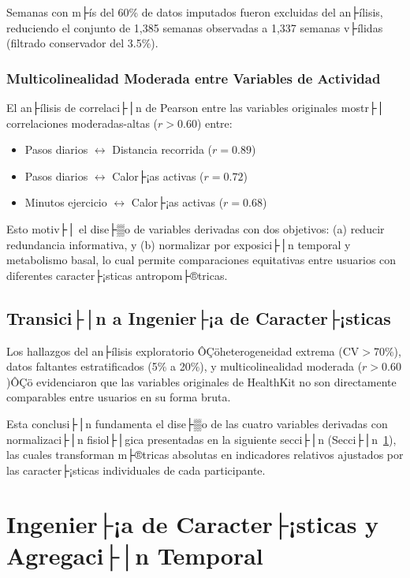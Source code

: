 Semanas con m├ís del 60\% de datos imputados fueron excluidas del an├ílisis, reduciendo el conjunto de 1,385 semanas observadas a 1,337 semanas v├ílidas (filtrado conservador del 3.5\%).

\subsubsection{Multicolinealidad Moderada entre Variables de Actividad}

El an├ílisis de correlaci├│n de Pearson entre las variables originales mostr├│ correlaciones moderadas-altas ($r>0.60$) entre:
\begin{itemize}
    \item Pasos diarios $\leftrightarrow$ Distancia recorrida ($r=0.89$)
    \item Pasos diarios $\leftrightarrow$ Calor├¡as activas ($r=0.72$)
    \item Minutos ejercicio $\leftrightarrow$ Calor├¡as activas ($r=0.68$)
\end{itemize}

Esto motiv├│ el dise├▒o de variables derivadas con dos objetivos: (a) reducir redundancia informativa, y (b) normalizar por exposici├│n temporal y metabolismo basal, lo cual permite comparaciones equitativas entre usuarios con diferentes caracter├¡sticas antropom├®tricas.

\subsection{Transici├│n a Ingenier├¡a de Caracter├¡sticas}
\label{subsec:transicion_feature_engineering}

Los hallazgos del an├ílisis exploratorio ÔÇöheterogeneidad extrema (CV$>$70\%), datos faltantes estratificados (5\% a 20\%), y multicolinealidad moderada ($r>0.60$)ÔÇö evidenciaron que las variables originales de HealthKit no son directamente comparables entre usuarios en su forma bruta.

Esta conclusi├│n fundamenta el dise├▒o de las cuatro variables derivadas con normalizaci├│n fisiol├│gica presentadas en la siguiente secci├│n (Secci├│n~\ref{sec:feature_engineering}), las cuales transforman m├®tricas absolutas en indicadores relativos ajustados por las caracter├¡sticas individuales de cada participante.

\section{Ingenier├¡a de Caracter├¡sticas y Agregaci├│n Temporal}
\label{sec:feature_engineering}

